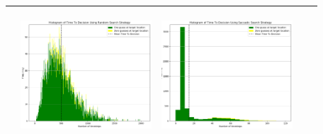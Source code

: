 \begin{landscape}
\begin{table}[h!]
\begin{tabular}{ | c | c | c | c | c |}
\begin{minipage}[c][52mm][c]{49mm}
    \end{minipage}
    &
    \begin{minipage}[c][52mm][c]{49mm}
      \includegraphics[width=49mm, height=49mm]{Chapters/MultiAgentTargetDetection/Figs/Histograms/VaryingPrior/Gaussian/GaussianRandomHistogram.png}
    \end{minipage}
    &
    \begin{minipage}[c][52mm][c]{49mm}
      \includegraphics[width=49mm, height=49mm]{Chapters/MultiAgentTargetDetection/Figs/Histograms/VaryingPrior/Gaussian/GaussianSaccadicHistogram.png}
    \end{minipage}
    \\
    \hline


\end{tabular}
\end{table}
\end{landscape}
